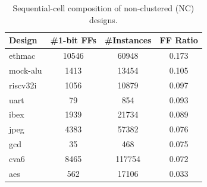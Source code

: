 \begin{table}[t]
\centering
\caption{Sequential-cell composition of non-clustered (NC) designs.}
\label{tab:nc_ff_ratio}
\begin{tabular}{lccc}
\toprule
Design & \#1-bit FFs & \#Instances & FF Ratio \\
\midrule
ethmac & 10546 & 60948 & 0.173 \\
mock-alu & 1413 & 13454 & 0.105 \\
riscv32i & 1056 & 10879 & 0.097 \\
uart & 79 & 854 & 0.093 \\
ibex & 1939 & 21734 & 0.089 \\
jpeg & 4383 & 57382 & 0.076 \\
gcd & 35 & 468 & 0.075 \\
cva6 & 8465 & 117754 & 0.072 \\
aes & 562 & 17106 & 0.033 \\
\bottomrule
\end{tabular}
\end{table}
